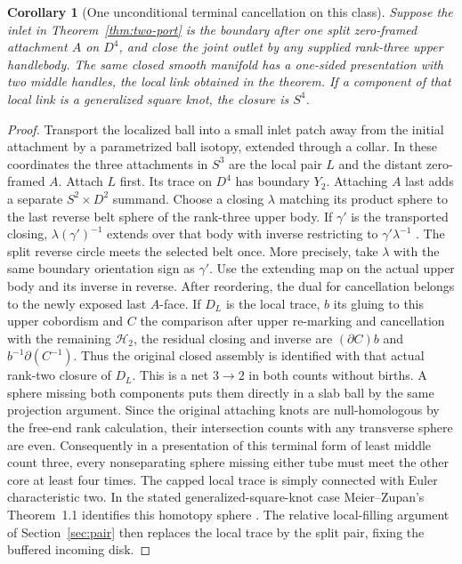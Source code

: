 \documentclass[11pt,letterpaper]{article}
\numberwithin{equation}{section}
\newtheorem{corollary}[theorem]{Corollary}
\theoremstyle{remark}
\newcommand{\HB}[1]{\mathcal H_{#1}}
\begin{document}
\begin{corollary}[One unconditional terminal cancellation on this class]
\label{cor:two-port-count}
Suppose the inlet in Theorem~\ref{thm:two-port} is the boundary after
one split zero-framed attachment \(A\) on \(D^4\), and close the
joint outlet by any supplied rank-three upper handlebody. The same
closed smooth manifold has a one-sided presentation with two middle
handles, the local link obtained in the theorem. If a component of
that local link is a generalized square knot, the closure is \(S^4\).
\end{corollary}
\begin{proof}
Transport the localized ball into a small inlet patch away from the
initial attachment by a parametrized ball isotopy, extended through
a collar. In these coordinates the three attachments in \(S^3\)
are the local pair \(L\) and the distant zero-framed \(A\). Attach
\(L\) first. Its trace on \(D^4\) has boundary \(Y_2\). Attaching
\(A\) last adds a separate \(S^2\times D^2\) summand. Choose a
closing \(\lambda\) matching its product sphere to the last reverse
belt sphere of the rank-three upper body. If \(\gamma'\) is the
transported closing, \(\lambda(\gamma')^{-1}\) extends over that
body with inverse restricting to \(\gamma'\lambda^{-1}\)
\cite{LaudenbachPoenaru1972Handlebodies}. The split reverse circle
meets the selected belt once. More precisely, take \(\lambda\) with
the same boundary orientation sign as \(\gamma'\). Use the extending
map on the actual upper body and its inverse in reverse. After
reordering, the dual for cancellation belongs to the newly exposed
last \(A\)-face. If \(D_L\) is the local trace, \(b\) its gluing
to this upper cobordism and \(C\) the comparison after upper
re-marking and cancellation with the remaining \(\HB2\), the residual
closing and inverse are \((\partial C)b\) and \(b^{-1}\partial(C^{-1})\).
Thus the original closed assembly is identified with that actual
rank-two closure of \(D_L\). This is a net
\(3\to2\) in both counts without births. A sphere missing both components puts them directly
in a slab ball by the same projection argument. Since the original
attaching knots are null-homologous by the free-end rank calculation,
their intersection counts with any transverse sphere are even.
Consequently in a presentation of this terminal form of least middle
count three, every nonseparating sphere missing either tube must meet
the other core at least four times. The capped local trace is
simply connected with Euler characteristic two. In the stated
generalized-square-knot case Meier--Zupan's Theorem~1.1 identifies
this homotopy sphere \cite{MeierZupan2022SquareKnots}. The relative
local-filling argument of Section~\ref{sec:pair} then replaces the
local trace by the split pair, fixing the buffered incoming disk.
\end{proof}
\end{document}
